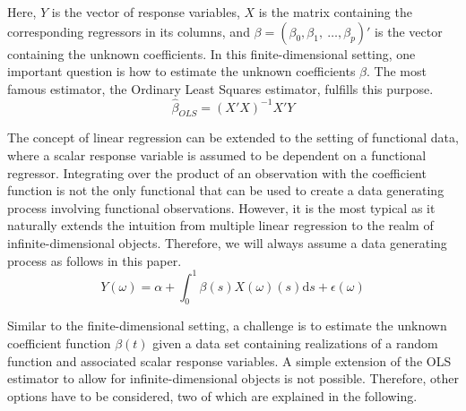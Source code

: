 \documentclass[11pt,twoside,a4paper]{article}
\begin{document}
	Here, $Y$ is the vector of response variables, $X$ is the matrix containing the corresponding regressors in its columns, and $\beta = (\beta_0, \beta_1, \: \dots, \beta_p)'$ is the vector containing the unknown coefficients.
	In this finite-dimensional setting, one important question is how to estimate the unknown coefficients $\beta$. The most famous estimator, the Ordinary Least Squares estimator, fulfills this purpose.
	\begin{equation}
		\hat{\beta}_{OLS} = (X'X)^{-1}X'Y
	\end{equation}
	
	The concept of linear regression can be extended to the setting of functional data, where a scalar response variable is assumed to be dependent on a functional regressor. 
	Integrating over the product of an observation with the coefficient function is not the only functional that can be used to create a data generating process involving functional observations. However, it is the most typical as it naturally extends the intuition from multiple linear regression to the realm of infinite-dimensional objects. Therefore, we will always assume a data generating process as follows in this paper.
	\begin{equation}\label{DGP}
		Y(\omega) = \alpha + \int_{0}^{1} \beta(s)X(\omega)(s) \mathrm{d}s + \epsilon(\omega)
	\end{equation}
	
	\newpage
	Similar to the finite-dimensional setting, a challenge is to estimate the unknown coefficient function $\beta(t)$ given a data set containing realizations of a random function and associated scalar response variables. A simple extension of the OLS estimator to allow for infinite-dimensional objects is not possible. Therefore, other options have to be considered, two of which are explained in the following.
	
\end{document}
